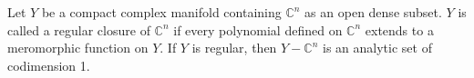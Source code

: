 Let $Y$ be a compact complex manifold containing $\mathbb{C}^n$ as an open dense subset. $Y$ is called a regular closure of $\mathbb{C}^n$ if every polynomial defined on $\mathbb{C}^n$ extends to a meromorphic function on $Y$. If $Y$ is regular, then $Y - \mathbb{C}^n$ is an analytic set of codimension 1.
